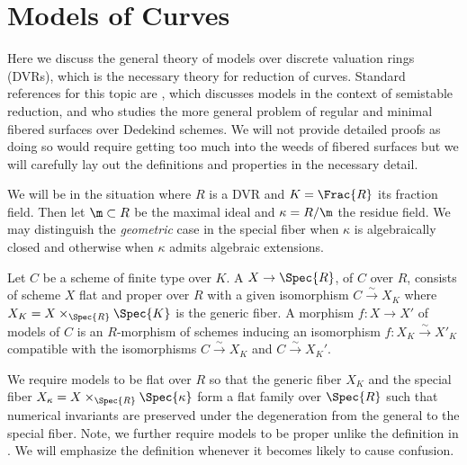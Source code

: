 \newcommand{\X}{\mathcal{X}}

\section{Models of Curves}

Here we discuss the general theory of models over discrete valuation rings (DVRs), which is the necessary theory for reduction of curves. Standard references for this topic are \cite[\href{https://stacks.math.columbia.edu/tag/0C2R}{Tag 0C2R}]{stacks-project}, which discusses models in the context of semistable reduction, and \cite[Chapter 9]{liu} who studies the more general problem of regular and minimal fibered surfaces over Dedekind schemes. We will not provide detailed proofs as doing so would require getting too much into the weeds of fibered surfaces but we will carefully lay out the definitions and properties in the necessary detail.

\begin{rmk}
We will be in the situation where $R$ is a DVR and $K = \Frac{R}$ its fraction field. Then let $\m \subset R$ be the maximal ideal and $\kappa = R / \m$ the residue field. We may distinguish the \textit{geometric} case in the special fiber when $\kappa$ is algebraically closed and otherwise when $\kappa$ admits algebraic extensions. 
\end{rmk}

\begin{defn}
Let $C$ be a scheme of finite type over $K$. A  $X \to \Spec{R}$, of $C$ over $R$, consists of scheme $X$ flat and proper over $R$ with a given isomorphism $C \xrightarrow{\sim} X_K$ where $X_K = X \times_{\Spec{R}} \Spec{K}$ is the generic fiber. A morphism $f : X \to X'$ of models of $C$ is an $R$-morphism of schemes inducing an isomorphism $f : X_K \xrightarrow{\sim} X'_K$ compatible with the isomorphisms $C \xrightarrow{\sim} X_K$ and $C \xrightarrow{\sim} X_K'$.
\end{defn}

\begin{rmk}
We require models to be flat over $R$ so that the generic fiber $X_K$ and the special fiber $X_\kappa = X \times_{\Spec{R}} \Spec{\kappa}$ form a flat family over $\Spec{R}$ such that numerical invariants are preserved under the degeneration from the general to the special fiber. Note, we further require models to be proper unlike the definition in \cite[\href{https://stacks.math.columbia.edu/tag/0C2R}{Tag 0C2R}]{stacks-project}. We will emphasize the definition whenever it becomes likely to cause confusion.
\end{rmk}

